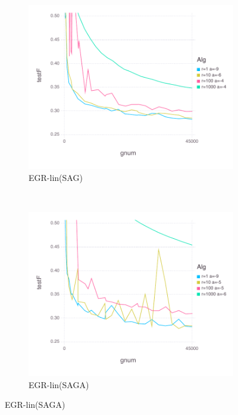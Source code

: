 \documentclass[11pt]{article}
\begin{document}
   
   \begin{figure}[H]
       \centering
\begin{subfigure}[b]{0.45\textwidth}
           \includegraphics[width=\textwidth]{Figures/MNISTBLtrueffFinal-linfalse.pdf}
           \caption{EGR-lin(SAG)}
       \end{subfigure}
       ~ %
       \begin{subfigure}[b]{0.45\textwidth}
           \includegraphics[width=\textwidth]{Figures/MNISTBLtrueffFinal-lintrue.pdf}
           \caption{EGR-lin(SAGA)} 
       \end{subfigure}
	   

\end{figure}
\end{document}
